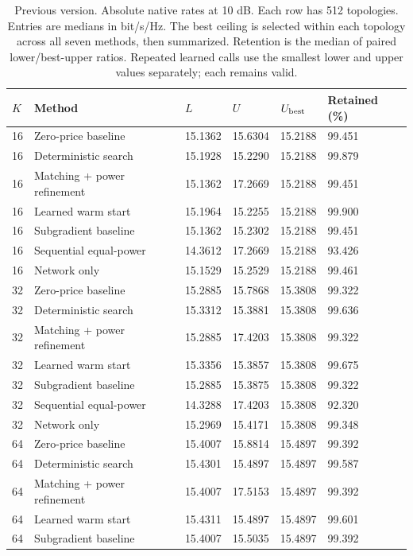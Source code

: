 \documentclass[10pt,letterpaper]{article}
\begin{document}
\begin{table}[p]\color{red}\centering\small
\setlength{\tabcolsep}{4pt}
\caption*{Previous version. Absolute native rates at 10 dB. Each row has 512 topologies. Entries are medians in bit/s/Hz. The best ceiling is selected within each topology across all seven methods, then summarized. Retention is the median of paired lower/best-upper ratios. Repeated learned calls use the smallest lower and upper values separately; each remains valid.}
\begin{tabular}{llllll}\toprule
$K$ & Method & $L$ & $U$ & $U_{\rm best}$ & Retained (\%)\\
\midrule
16 & Zero-price baseline & 15.1362 & 15.6304 & 15.2188 & 99.451\\
16 & Deterministic search & 15.1928 & 15.2290 & 15.2188 & 99.879\\
16 & Matching + power refinement & 15.1362 & 17.2669 & 15.2188 & 99.451\\
16 & Learned warm start & 15.1964 & 15.2255 & 15.2188 & 99.900\\
16 & Subgradient baseline & 15.1362 & 15.2302 & 15.2188 & 99.451\\
16 & Sequential equal-power & 14.3612 & 17.2669 & 15.2188 & 93.426\\
16 & Network only & 15.1529 & 15.2529 & 15.2188 & 99.461\\
32 & Zero-price baseline & 15.2885 & 15.7868 & 15.3808 & 99.322\\
32 & Deterministic search & 15.3312 & 15.3881 & 15.3808 & 99.636\\
32 & Matching + power refinement & 15.2885 & 17.4203 & 15.3808 & 99.322\\
32 & Learned warm start & 15.3356 & 15.3857 & 15.3808 & 99.675\\
32 & Subgradient baseline & 15.2885 & 15.3875 & 15.3808 & 99.322\\
32 & Sequential equal-power & 14.3288 & 17.4203 & 15.3808 & 92.320\\
32 & Network only & 15.2969 & 15.4171 & 15.3808 & 99.348\\
64 & Zero-price baseline & 15.4007 & 15.8814 & 15.4897 & 99.392\\
64 & Deterministic search & 15.4301 & 15.4897 & 15.4897 & 99.587\\
64 & Matching + power refinement & 15.4007 & 17.5153 & 15.4897 & 99.392\\
64 & Learned warm start & 15.4311 & 15.4897 & 15.4897 & 99.601\\
64 & Subgradient baseline & 15.4007 & 15.5035 & 15.4897 & 99.392\\

\end{tabular}
\end{table}
\end{document}
